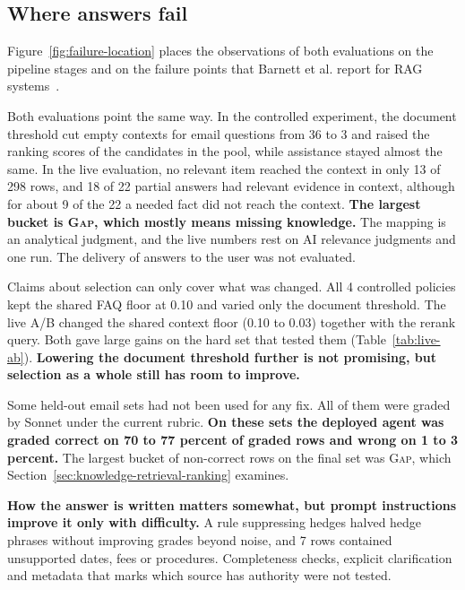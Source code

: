 \subsection{Where answers fail}

Figure~\ref{fig:failure-location} places the observations of both evaluations on the pipeline stages and on the failure points that Barnett et al. report for RAG systems~\cite{barnett2024seven}.



Both evaluations point the same way. In the controlled experiment, the document threshold cut empty contexts for email questions from 36 to 3 and raised the ranking scores of the candidates in the pool, while assistance stayed almost the same. In the live evaluation, no relevant item reached the context in only 13 of 298 rows, and 18 of 22 partial answers had relevant evidence in context, although for about 9 of the 22 a needed fact did not reach the context. \textbf{The largest bucket is \textsc{Gap}, which mostly means missing knowledge.} The mapping is an analytical judgment, and the live numbers rest on AI relevance judgments and one run. The delivery of answers to the user was not evaluated.

Claims about selection can only cover what was changed. All 4 controlled policies kept the shared FAQ floor at 0.10 and varied only the document threshold. The live A/B changed the shared context floor (0.10 to 0.03) together with the rerank query. Both gave large gains on the hard set that tested them (Table~\ref{tab:live-ab}). \textbf{Lowering the document threshold further is not promising, but selection as a whole still has room to improve.}

Some held-out email sets had not been used for any fix. All of them were graded by Sonnet under the current rubric. \textbf{On these sets the deployed agent was graded correct on 70 to 77 percent of graded rows and wrong on 1 to 3 percent.} The largest bucket of non-correct rows on the final set was \textsc{Gap}, which Section~\ref{sec:knowledge-retrieval-ranking} examines.

\textbf{How the answer is written matters somewhat, but prompt instructions improve it only with difficulty.} A rule suppressing hedges halved hedge phrases without improving grades beyond noise, and 7 rows contained unsupported dates, fees or procedures. Completeness checks, explicit clarification and metadata that marks which source has authority were not tested.

